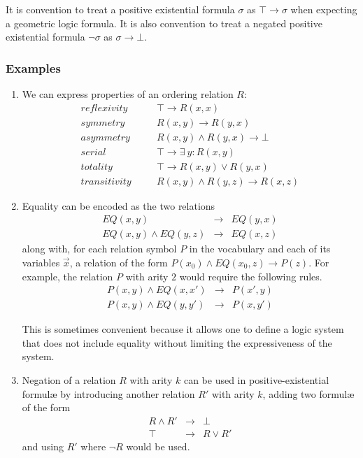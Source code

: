 		It is convention to treat a positive existential formula $\sigma$ as
		$\top \to \sigma$ when expecting a geometric logic formula. It is also
		convention to treat a negated positive existential formula $\neg\sigma$
		as $\sigma \to \bot$.


		\subsubsection{Examples}
		\label{sec:technical_background.geometric_logic.examples}

			\begin{enumerate}
			\item
			We can express properties of an ordering relation $R$:
			\begin{eqnarray*}
			reflexivity   & \quad & \top \to R(x,x)                  \\
			symmetry      & \quad & R(x,y) \to R(y,x)                \\
			asymmetry     & \quad & R(x,y) \wedge R(y,x) \to \bot    \\
			serial        & \quad & \top \to \exists\ y : R(x,y)     \\
			totality      & \quad & \top \to R(x,y) \vee R(y,x)      \\
			transitivity  & \quad & R(x,y) \wedge R(y,z) \to R(x,z)
			\end{eqnarray*}

			\item \label{simulate_equality}
			Equality can be encoded as the two relations
				\begin{eqnarray*}
				EQ(x,y)                & \to & EQ(y,x)  \\
				EQ(x,y) \wedge EQ(y,z) & \to & EQ(x,z)
				\end{eqnarray*}
			along with, for each relation symbol $P$ in the vocabulary and each
			of its variables $\vec x$, a relation of the form $P(x_0) \wedge
			EQ(x_0,z) \to P(z)$. For example, the relation $P$ with arity $2$
			would require the following rules.
				\begin{eqnarray*}
				P(x,y) \wedge EQ(x,x') & \to & P(x',y)  \\
				P(x,y) \wedge EQ(y,y') & \to & P(x,y')
				\end{eqnarray*}

			This is sometimes convenient because it allows one to define a
			logic system that does not include equality without limiting
			the expressiveness of the system.

			\item
			Negation of a relation $R$ with arity $k$ can be used in
			positive-existential formul{\ae} by introducing another relation
			$R'$ with arity $k$, adding two formul{\ae} of the form
				\begin{eqnarray*}
				R \wedge R' & \to & \bot       \\
				\top        & \to & R \vee R'
				\end{eqnarray*}
			and using $R'$ where $\neg R$ would be used.


\end{enumerate}
